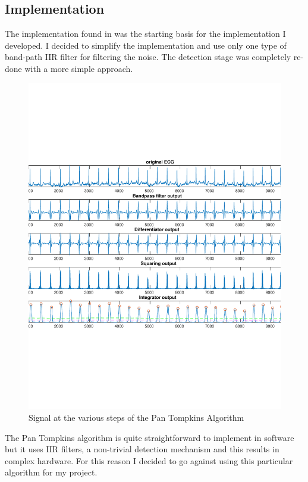 \documentclass{article}
\begin{document}
\subsection{Implementation}

The implementation found in \cite{hooman} was the starting basis for the implementation I developed. I decided to simplify the implementation and use only one type of band-path IIR filter for filtering the noise. The detection stage was completely re-done with a more simple approach.

\begin{figure}%
        \centering
        \includegraphics[scale=0.4]{./figs/pan_tompkins30s.pdf}
        \caption{Signal at the various steps of the Pan Tompkins Algorithm}
        \label{fig:pan}
\end{figure}

The Pan Tompkins algorithm is quite straightforward to implement in software but it uses IIR filters, a non-trivial detection mechanism and this results in complex hardware. For this reason I decided to go against using this particular algorithm for my project.
\end{document}

